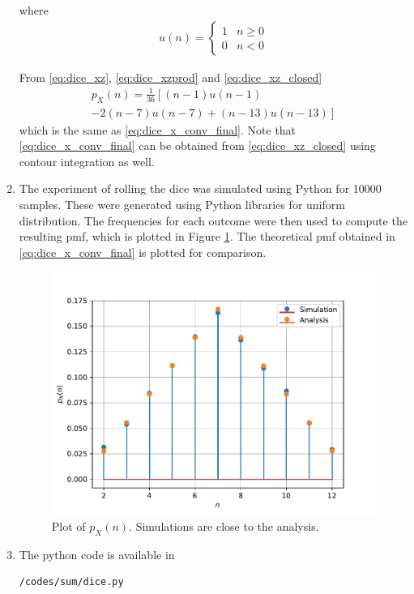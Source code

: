 \documentclass[journal,8pt,onecolumn]{IEEEtran}
\providecommand{\lsbrak}[1]{\ensuremath{{}\left[#1\right.}}
\providecommand{\rsbrak}[1]{\ensuremath{{}\left.#1\right]}}
\providecommand{\brak}[1]{\ensuremath{\left(#1\right)}}
\begin{document}
\begin{enumerate}
where 
\begin{align}
u(n) =
\begin{cases}
1 & n \ge 0
\\
0 & n < 0
\end{cases}
\end{align}

From \eqref{eq:dice_xz}, \eqref{eq:dice_xzprod} and \eqref{eq:dice_xz_closed}
\begin{multline}
p_{X}(n) = \frac{1}{36}\lsbrak{\brak{n-1}u(n-1) 
}
\\
\rsbrak{- 2 \brak{n-7}u(n-7)+\brak{n-13}u(n-13)}
\end{multline}
which is the same as \eqref{eq:dice_x_conv_final}.  Note that  \eqref{eq:dice_x_conv_final} can be obtained from \eqref{eq:dice_xz_closed} using contour integration as well.

\item 
The experiment of rolling the dice was simulated using Python for 10000 samples.  These were generated using Python libraries for uniform distribution. The frequencies for each outcome were then used to compute the resulting pmf, which  is plotted in Figure \ref{fig:dice}.  The theoretical pmf obtained in \eqref{eq:dice_x_conv_final} is plotted for comparison.  
%
\begin{figure}[H]
\centering
\includegraphics[width=\columnwidth/2]{./figs/pmf.pdf}
\caption{Plot of $p_X(n)$.  Simulations are close to the analysis. }
\label{fig:dice}
\end{figure}
\item The python code is available in 
\begin{lstlisting}
/codes/sum/dice.py
\end{lstlisting}

\end{enumerate}
\end{document}

